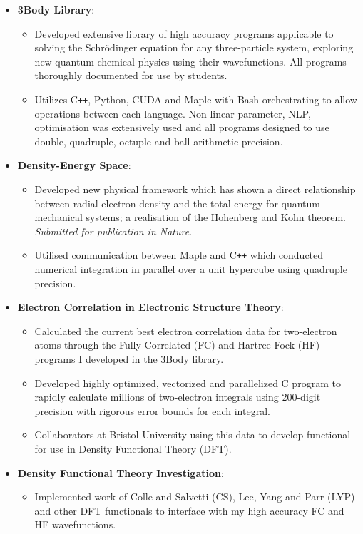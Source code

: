 {\begin{itemize}
	\item \textbf{3Body Library}:
	\begin{itemize}
		\item Developed extensive library of high accuracy programs applicable to solving the Schr\"{o}dinger equation for any three-particle system, exploring new quantum chemical physics using their wavefunctions. All programs thoroughly documented for use by students.
		\item Utilizes C\texttt{++}, Python, CUDA and Maple with Bash orchestrating to allow operations between each language. Non-linear parameter, NLP, optimisation was extensively used and all programs designed to use double, quadruple, octuple and ball arithmetic precision.
	\end{itemize}
	\item \textbf{Density-Energy Space}:
	\begin{itemize}
		\item Developed new physical framework which has shown a direct relationship between radial electron density and the total energy for quantum mechanical systems; a realisation of the Hohenberg and Kohn theorem. \textit{Submitted for publication in Nature}.
		\item Utilised communication between Maple and C\texttt{++} which conducted numerical integration in parallel over a unit hypercube using quadruple precision.
	\end{itemize}
	\item \textbf{Electron Correlation in Electronic Structure Theory}:
	\begin{itemize}
		\item Calculated the current best electron correlation data for two-electron atoms through the Fully Correlated (FC) and Hartree Fock (HF) programs I developed in the 3Body library.
		\item Developed highly optimized, vectorized and parallelized C program to rapidly calculate millions of two-electron integrals using 200-digit precision with rigorous error bounds for each integral.
		\item Collaborators at Bristol University using this data to develop functional for use in Density Functional Theory (DFT).
	\end{itemize}
	\item \textbf{Density Functional Theory Investigation}:
	\begin{itemize}
		\item Implemented work of Colle and Salvetti (CS), Lee, Yang and Parr (LYP) and other DFT functionals to interface with my high accuracy FC and HF wavefunctions.

\end{itemize}
\end{itemize}}
